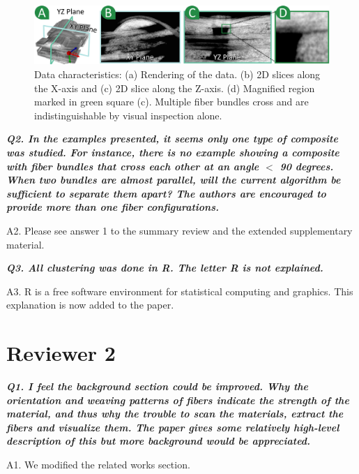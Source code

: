 \documentclass[]{article}
\begin{document}
\begin{figure}[tb]
	\centering
	\includegraphics[width=\linewidth]{images_pvis/data-char.pdf}
	\caption{Data characteristics: (a) Rendering of the data. (b) 2D slices along the X-axis and (c) 2D slice along the Z-axis. (d) Magnified region marked in green square (c). Multiple fiber bundles cross and are indistinguishable by visual inspection alone. }
	\label{fig:data-char-rebuttal}
\end{figure}


\textbf{\textit{
Q2. In the examples presented, it seems only one type of composite was studied. For instance, there is no example showing a composite with fiber bundles that cross each other at an angle $<$ 90 degrees. When two bundles are almost parallel, will the current algorithm be sufficient to separate them apart? The authors are encouraged to provide more than one fiber configurations.
}}


A2. Please see answer 1 to the summary review and the extended supplementary material.  

\makebox[\linewidth]{\rule{0.25\textwidth}{0.4pt}}


\textbf{\textit{
Q3. All clustering was done in R. The letter R is not explained.
}}


A3. R is a free software environment for statistical computing and graphics. This explanation is now added to the paper.

\makebox[\linewidth]{\rule{0.25\textwidth}{0.4pt}}

\section*{Reviewer 2}

\textbf{\textit{
Q1. I feel the background section could be improved. Why the orientation and weaving patterns of fibers indicate the strength of the material, and thus why the trouble to scan the materials, extract the fibers and visualize them. The paper gives some relatively high-level description of this but more background would be appreciated.
}}



A1. We modified the related works section.
\end{document}
